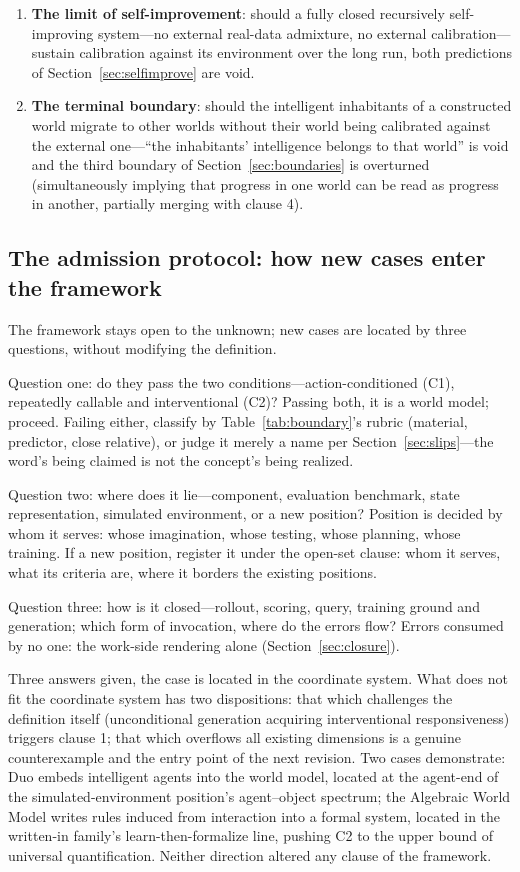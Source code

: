 \documentclass[10pt]{article}
\begin{document}
\begin{enumerate}
\item \textbf{The limit of self-improvement}: should a fully closed recursively self-improving system---no external real-data admixture, no external calibration---sustain calibration against its environment over the long run, both predictions of Section~\ref{sec:selfimprove} are void.
\item \textbf{The terminal boundary}: should the intelligent inhabitants of a constructed world migrate to other worlds without their world being calibrated against the external one---``the inhabitants' intelligence belongs to that world'' is void and the third boundary of Section~\ref{sec:boundaries} is overturned (simultaneously implying that progress in one world can be read as progress in another, partially merging with clause 4).
\end{enumerate}

\subsection{The admission protocol: how new cases enter the framework}\label{sec:admission}

The framework stays open to the unknown; new cases are located by three questions, without modifying the definition.

Question one: do they pass the two conditions---action-conditioned (C1), repeatedly callable and interventional (C2)? Passing both, it is a world model; proceed. Failing either, classify by Table~\ref{tab:boundary}'s rubric (material, predictor, close relative), or judge it merely a name per Section~\ref{sec:slips}---the word's being claimed is not the concept's being realized.

Question two: where does it lie---component, evaluation benchmark, state representation, simulated environment, or a new position? Position is decided by whom it serves: whose imagination, whose testing, whose planning, whose training. If a new position, register it under the open-set clause: whom it serves, what its criteria are, where it borders the existing positions.

Question three: how is it closed---rollout, scoring, query, training ground and generation; which form of invocation, where do the errors flow? Errors consumed by no one: the work-side rendering alone (Section~\ref{sec:closure}).

Three answers given, the case is located in the coordinate system. What does not fit the coordinate system has two dispositions: that which challenges the definition itself (unconditional generation acquiring interventional responsiveness) triggers clause 1; that which overflows all existing dimensions is a genuine counterexample and the entry point of the next revision. Two cases demonstrate: Duo embeds intelligent agents into the world model, located at the agent-end of the simulated-environment position's agent--object spectrum\cite{duo2026}; the Algebraic World Model writes rules induced from interaction into a formal system, located in the written-in family's learn-then-formalize line, pushing C2 to the upper bound of universal quantification\cite{awm2026}. Neither direction altered any clause of the framework.
\end{document}
